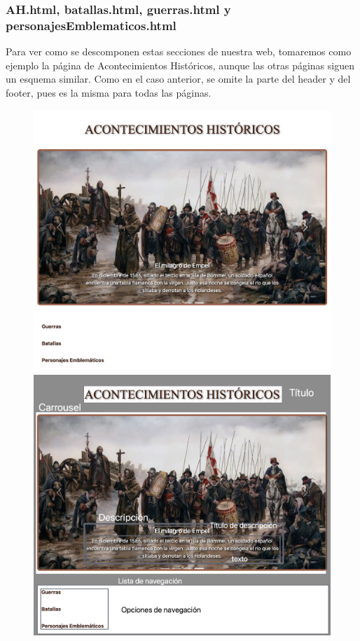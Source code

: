 \documentclass{article}
\begin{document}
\newpage

\subsubsection*{AH.html, batallas.html, guerras.html y personajesEmblematicos.html}

Para ver como se descomponen estas secciones de nuestra web, tomaremos como ejemplo la página de Acontecimientos Históricos, aunque las otras páginas siguen un esquema similar. Como en el caso anterior, se omite la parte del header y del footer, pues es la misma para todas las páginas.

\begin{figure}[H]
    \centering
    \begin{minipage}{0.49\textwidth}
        \includegraphics[width=\linewidth]{htmlFotos/AH.jpg}
    \end{minipage}\hfill
    \begin{minipage}{0.49\textwidth}
        \includegraphics[width=\linewidth]{htmlFotos/prototipoAH.jpg}

\end{minipage}
\end{figure}
\end{document}
